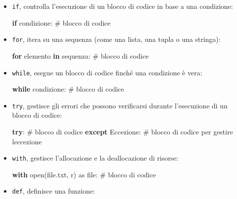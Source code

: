 \documentclass[
  letterpaper,
]{scrbook}
\newenvironment{Shaded}{\begin{snugshade}}{\end{snugshade}}
\newcommand{\BuiltInTok}[1]{\textcolor[rgb]{0.00,0.23,0.31}{#1}}
\newcommand{\CommentTok}[1]{\textcolor[rgb]{0.37,0.37,0.37}{#1}}
\newcommand{\ControlFlowTok}[1]{\textcolor[rgb]{0.00,0.23,0.31}{\textbf{#1}}}
\newcommand{\ImportTok}[1]{\textcolor[rgb]{0.00,0.46,0.62}{#1}}
\newcommand{\KeywordTok}[1]{\textcolor[rgb]{0.00,0.23,0.31}{\textbf{#1}}}
\newcommand{\NormalTok}[1]{\textcolor[rgb]{0.00,0.23,0.31}{#1}}
\newcommand{\StringTok}[1]{\textcolor[rgb]{0.13,0.47,0.30}{#1}}
\begin{document}
\begin{itemize}
\item
  \texttt{if}, controlla l'esecuzione di un blocco di codice in base a
  una condizione:

\begin{Shaded}
\begin{Highlighting}[]
\ControlFlowTok{if}\NormalTok{ condizione:}
    \CommentTok{\# blocco di codice}
\end{Highlighting}
\end{Shaded}
\item
  \texttt{for}, itera su una sequenza (come una lista, una tupla o una
  stringa):

\begin{Shaded}
\begin{Highlighting}[]
\ControlFlowTok{for}\NormalTok{ elemento }\KeywordTok{in}\NormalTok{ sequenza:}
    \CommentTok{\# blocco di codice}
\end{Highlighting}
\end{Shaded}
\item
  \texttt{while}, esegue un blocco di codice finché una condizione è
  vera:

\begin{Shaded}
\begin{Highlighting}[]
\ControlFlowTok{while}\NormalTok{ condizione:}
    \CommentTok{\# blocco di codice}
\end{Highlighting}
\end{Shaded}
\item
  \texttt{try}, gestisce gli errori che possono verificarsi durante
  l'esecuzione di un blocco di codice:

\begin{Shaded}
\begin{Highlighting}[]
\ControlFlowTok{try}\NormalTok{:}
    \CommentTok{\# blocco di codice}
\ControlFlowTok{except}\NormalTok{ Eccezione:}
    \CommentTok{\# blocco di codice per gestire l\textquotesingle{}eccezione}
\end{Highlighting}
\end{Shaded}
\item
  \texttt{with}, gestisce l'allocazione e la deallocazione di risorse:

\begin{Shaded}
\begin{Highlighting}[]
\ControlFlowTok{with} \BuiltInTok{open}\NormalTok{(}\StringTok{\textquotesingle{}file.txt\textquotesingle{}}\NormalTok{, }\StringTok{\textquotesingle{}r\textquotesingle{}}\NormalTok{) }\ImportTok{as} \BuiltInTok{file}\NormalTok{:}
    \CommentTok{\# blocco di codice}
\end{Highlighting}
\end{Shaded}
\item
  \texttt{def}, definisce una funzione:


\end{itemize}
\end{document}
